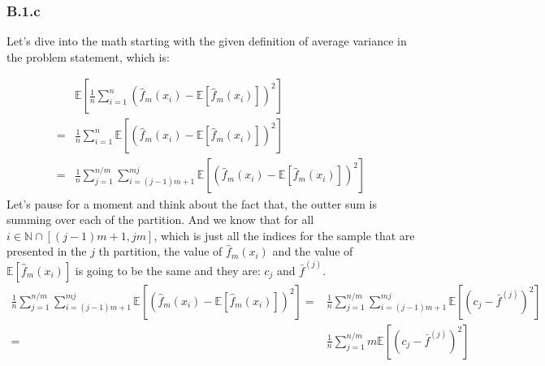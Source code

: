 \documentclass[]{article}
\begin{document}
    \subsubsection*{B.1.c}
        \hspace{1.1em}
        Let's dive into the math starting with the given definition of average variance in the problem statement, which is: 
        \par
        \begin{align*}\tag{B.1.c.1}\label{eqn:B.1.c.1}
            & \mathbb{E}\left[
                \frac{1}{n}
                \sum_{i = 1}^{n}\left(
                    \hat{f}_m(x_i) - \mathbb{E}\left[\hat{f}_m(x_i)\right]
                \right)^2
            \right] 
            \\=& 
            \frac{1}{n}
            \sum_{i = 1}^{n}
            \mathbb{E}\left[
                \left(
                    \hat{f}_m(x_i) - \mathbb{E}\left[\hat{f}_m(x_i)\right]
                \right)^2
            \right]
            \\
            =&
            \frac{1}{n}\sum_{j = 1}^{n/m}\sum_{i = (j - 1)m + 1}^{mj}
            \mathbb{E}\left[
                \left(
                    \hat{f}_m(x_i) - \mathbb{E}\left[\hat{f}_m(x_i)\right]
                \right)^2
            \right]
        \end{align*}
        Let's pause for a moment and think about the fact that, the outter sum is summing over each of the partition. And we know that for all $i\in \mathbb{N}\cap[(j - 1)m + 1, jm]$, which is just all the indices for the sample that are presented in the $j$ th partition, the value of $\hat{f}_m(x_i)$ and the value of $\mathbb{E}\left[\hat{f}_m(x_i)\right]$ is going to be the same and they are: $c_j$ and $\bar{f}^{(j)}$. 
        \begin{align*}\tag{B.1.c.2}\label{eqn:B.1.c.2}
            \frac{1}{n}\sum_{j = 1}^{n/m}\sum_{i = (j - 1)m + 1}^{mj}
            \mathbb{E}\left[
                \left(
                    \hat{f}_m(x_i) - \mathbb{E}\left[\hat{f}_m(x_i)\right]
                \right)^2
            \right] 
            = &
            \frac{1}{n}\sum_{j = 1}^{n/m}\sum_{i = (j - 1)m + 1}^{mj}
            \mathbb{E}\left[
                \left(
                    c_j - \bar{f}^{(j)}
                \right)^2
            \right] 
            \\
            =& 
            \frac{1}{n}\sum_{j = 1}^{n/m}
                m\mathbb{E}\left[
                    (c_j - \bar{f}^{(j)})^2
                \right] 
        \end{align*}
\end{document}
